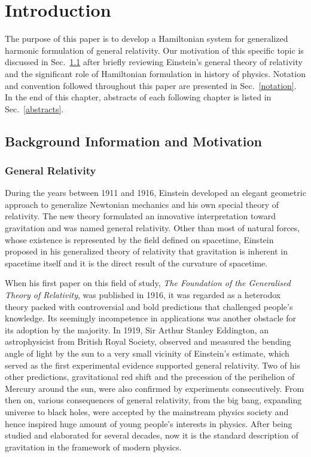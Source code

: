 \chapter{Introduction}\label{introduction}
The purpose of this paper is to develop a Hamiltonian system for generalized harmonic formulation of general relativity. Our motivation of this specific topic is discussed in Sec.~\ref{background} after briefly reviewing Einstein's general theory of relativity and the significant role of Hamiltonian formulation in history of physics. Notation and convention followed throughout this paper are presented in Sec.~\ref{notation}. In the end of this chapter, abstracts of each following chapter is listed in Sec.~\ref{abstracts}.
\section{Background Information and Motivation}\label{background}
\subsection{General Relativity}\label{gr}
During the years between 1911 and 1916, Einstein developed an elegant geometric approach to generalize Newtonian mechanics and his own special theory of relativity. The new theory formulated an innovative interpretation toward gravitation and was named general relativity. Other than most of natural forces, whose existence is represented by the field defined on spacetime, Einstein proposed in his generalized theory of relativity that gravitation is inherent in spacetime itself and it is the direct result of the curvature of spacetime\cite{carroll2003spacetime}.

When his first paper on this field of study, {\it The Foundation of the Generalised Theory of Relativity}, was published in 1916, it was regarded as a heterodox theory packed with controversial and bold predictions that challenged people's knowledge. Its seemingly incompetence in applications was another obstacle for its adoption by the majority. In 1919, Sir Arthur Stanley Eddington, an astrophysicist from British Royal Society, observed and measured the bending angle of light by the sun to a very small vicinity of Einstein's estimate, which served as the first experimental evidence supported general relativity. Two of his other predictions, gravitational red shift and the precession of the perihelion of Mercury around the sun, were also confirmed by experiments consecutively. From then on, various consequences of general relativity, from the big bang, expanding universe to black holes, were accepted by the mainstream physics society and hence inspired huge amount of young people's interests in physics. After being studied and elaborated for several decades, now it is the standard description of gravitation in the framework of modern physics. 

